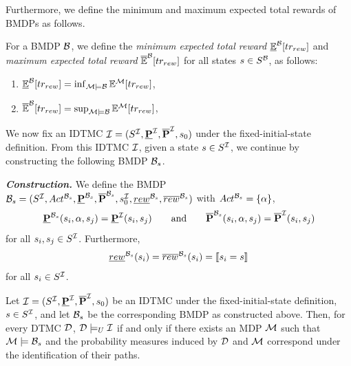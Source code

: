 Furthermore, we define the minimum and maximum expected total rewards of BMDPs as follows.

\begin{definition}\label{def:expected-total-rewards-of-bmpds}
    For a BMDP $\mathcal{B}$, we define the \textit{minimum expected total reward} $\mathbb{\underline{E}}^{\mathcal{B}}[tr_{rew}]$ and \textit{maximum expected total reward} $\mathbb{\overline{E}}^{\mathcal{B}}[tr_{rew}]$ for all states $s\in S^{\mathcal{B}}$, as follows:
    \begin{enumerate}[label=(\roman*)]
        \item $\mathbb{\underline{E}}^{\mathcal{B}}[tr_{rew}] = \inf_{\mathcal{M}\models\mathcal{B}} \mathbb{E}^{\mathcal{M}}[tr_{rew}]$,
        \item $\mathbb{\overline{E}}^{\mathcal{B}}[tr_{rew}] = \sup_{\mathcal{M}\models\mathcal{B}} \mathbb{E}^{\mathcal{M}}[tr_{rew}]$,
    \end{enumerate}
\end{definition}

We now fix an IDTMC $\mathcal{I} = (S^{\mathcal{I}},\mathbf{\underline{P}}^{\mathcal{I}},\mathbf{\overline{P}}^{\mathcal{I}},s_0)$ under the fixed-initial-state definition. From this IDTMC $\mathcal{I}$, given a state $s\in S^{\mathcal{I}}$, we continue by constructing the following BMDP $\mathcal{B}_s$.

\emph{\textbf{Construction.}} We define the BMDP $\mathcal{B}_s = (S^{\mathcal{I}},Act^{\mathcal{B}_s},\mathbf{\underline{P}}^{\mathcal{B}_s},\mathbf{\overline{P}}^{\mathcal{B}_s},s_0^{\mathcal{I}},\underline{rew}^{\mathcal{B}_s},\overline{rew}^{\mathcal{B}_s})$ with $Act^{\mathcal{B}_s} = \{\alpha\}$,
\[\mathbf{\underline{P}}^{\mathcal{B}_s}(s_i,\alpha,s_j) = \mathbf{\underline{P}}^{\mathcal{I}}(s_i,s_j) \qquad \text{and} \qquad \mathbf{\overline{P}}^{\mathcal{B}_s}(s_i,\alpha,s_j) = \mathbf{\overline{P}}^{\mathcal{I}}(s_i,s_j)\]
for all $s_i,s_j \in S^{\mathcal{I}}$.
Furthermore,
\[
\underline{rew}^{\mathcal{B}_s}(s_i)
=
\overline{rew}^{\mathcal{B}_s}(s_i)
=
\llbracket s_i = s \rrbracket
\]
for all $s_i \in S^{\mathcal{I}}$.

\begin{lemma}\label{lem:correspondance-between-satisfying-dtmcs-and-mdps}
\label{lem:DTMC_MDP_correspondence}
Let $\mathcal{I} = (S^{\mathcal{I}},\mathbf{\underline{P}}^{\mathcal{I}},\mathbf{\overline{P}}^{\mathcal{I}},s_0)$ be an IDTMC under the fixed-initial-state definition, $s\in S^{\mathcal{I}}$, and let $\mathcal{B}_s$ be the corresponding BMDP as constructed above. Then, for every DTMC $\mathcal{D}$, $\mathcal{D}\models_U\mathcal{I}$ if and only if there exists an MDP $\mathcal{M}$ such that $\mathcal{M}\models\mathcal{B}_s$ and the probability measures induced by $\mathcal{D}$ and $\mathcal{M}$ correspond under the identification of their paths.
\end{lemma}

